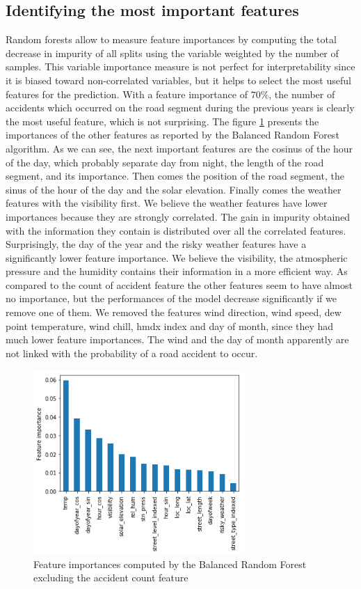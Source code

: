 \documentclass[conference]{IEEEtran}
\begin{document}
\subsection{Identifying the most important features}
Random forests allow to measure feature importances by computing the total decrease in impurity of all splits using the variable weighted by the number of samples.
This variable importance measure is not perfect for interpretability since it is biased toward non-correlated variables, but it helps to select the most useful features for the prediction.
With a feature importance of $70\%$, the number of accidents which occurred on the road segment during the previous years is clearly the most useful feature, which is not surprising.
The figure \ref{feature importances} presents the importances of the other features as reported by the Balanced Random Forest algorithm.
As we can see, the next important features are the cosinus of the hour of the day, which probably separate day from night, the length of the road segment, and its importance.
Then comes the position of the road segment, the sinus of the hour of the day and the solar elevation. Finally comes the weather features with the visibility first.
We believe the weather features have lower importances because they are strongly correlated. 
The gain in impurity obtained with the information they contain is distributed over all the correlated features.
Surprisingly, the day of the year and the risky weather features have a significantly lower feature importance. 
We believe the visibility, the atmospheric pressure and the humidity contains their information in a more efficient way.
As compared to the count of accident feature the other features seem to have almost no importance, but the performances of the model decrease significantly if we remove one of them.
We removed the features wind direction, wind speed, dew point temperature, wind chill, hmdx index and day of month, since they had much lower feature importances. The wind and the day of month apparently are not linked with the probability of a road accident to occur.


\begin{figure}[htbp]
\centerline{\includegraphics[height=7cm, keepaspectratio]{figures/brf_fi_nocount.png}}
\caption{Feature importances computed by the Balanced Random Forest excluding the accident count feature}
\label{feature importances}
\end{figure}
\end{document}
